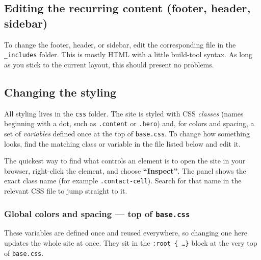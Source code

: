 \documentclass[11pt,a4paper]{article}
\newcommand{\file}[1]{\texttt{#1}}
\begin{document}
\subsection{Editing the recurring content (footer, header, sidebar)}

To change the footer, header, or sidebar, edit the corresponding file in
the \file{\_includes} folder. This is mostly HTML with a little build-tool
syntax. As long as you stick to the current layout, this should present no
problems.

\subsection{Changing the styling}

All styling lives in the \file{css} folder. The site is styled with CSS
\emph{classes} (names beginning with a dot, such as \texttt{.content} or
\texttt{.hero}) and, for colors and spacing, a set of \emph{variables}
defined once at the top of \file{base.css}. To change how something looks,
find the matching class or variable in the file listed below and edit it.

\begin{tipbox}
The quickest way to find what controls an element is to open the site in
your browser, right-click the element, and choose \textbf{``Inspect''}.
The panel shows the exact class name (for example \texttt{.contact-cell}).
Search for that name in the relevant CSS file to jump straight to it.
\end{tipbox}

\subsubsection*{Global colors and spacing --- top of \file{base.css}}

These variables are defined once and reused everywhere, so changing one
here updates the whole site at once. They sit in the
\texttt{:root \{ \dots \}} block at the very top of \file{base.css}.
\end{document}
